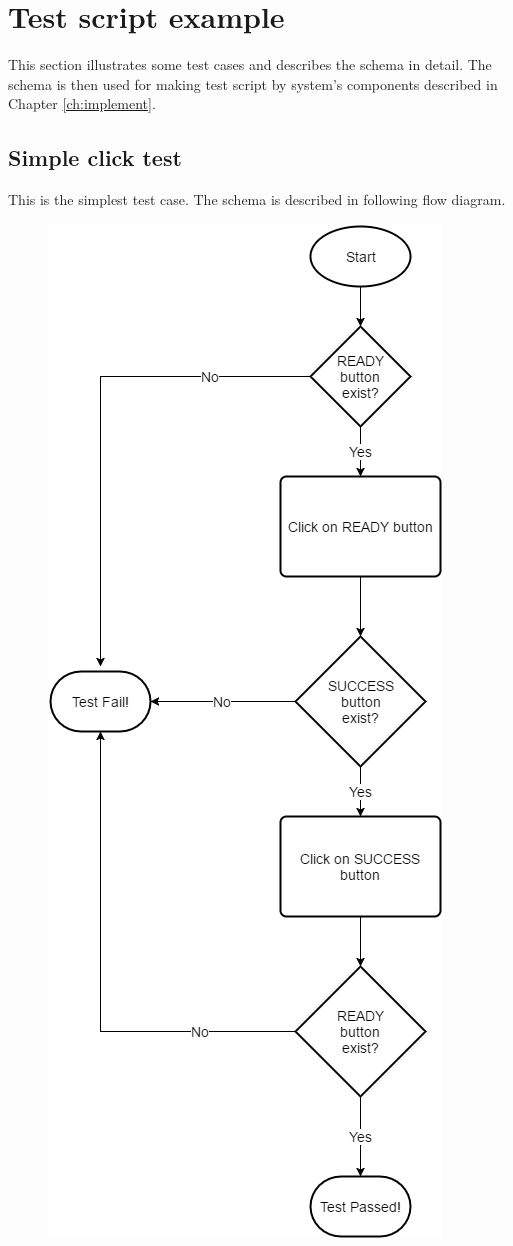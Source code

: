 \section{Test script example}
\label{sec:eg_script}
This section illustrates some test cases and describes the schema in detail. The schema is then used for making test script by system's components described in Chapter \ref{ch:implement}.

\subsection{Simple click test}
This is the simplest test case. The schema is described in following flow diagram.

	\begin{figure}[H]
		\centering
		\includegraphics[scale=0.55]{Chapters/Fig/click_test_diag.png}

\end{figure}
